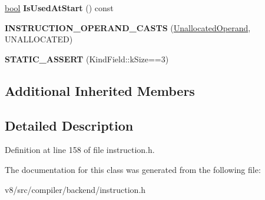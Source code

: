 \begin{DoxyCompactItemize}
\mbox{\label{classv8_1_1internal_1_1compiler_1_1UnallocatedOperand_a6c28fc45804f2f28a4a58321ccce1fe8}} 
\mbox{\hyperlink{classbool}{bool}} {\bfseries Is\+Used\+At\+Start} () const
\item 
\mbox{\label{classv8_1_1internal_1_1compiler_1_1UnallocatedOperand_aa1f74bb77dcc743aa2d99418bfd5607e}} 
{\bfseries I\+N\+S\+T\+R\+U\+C\+T\+I\+O\+N\+\_\+\+O\+P\+E\+R\+A\+N\+D\+\_\+\+C\+A\+S\+TS} (\mbox{\hyperlink{classv8_1_1internal_1_1compiler_1_1UnallocatedOperand}{Unallocated\+Operand}}, U\+N\+A\+L\+L\+O\+C\+A\+T\+ED)
\item 
\mbox{\label{classv8_1_1internal_1_1compiler_1_1UnallocatedOperand_ad1f69843107333599cda246905caf549}} 
{\bfseries S\+T\+A\+T\+I\+C\+\_\+\+A\+S\+S\+E\+RT} (Kind\+Field\+::k\+Size==3)
\end{DoxyCompactItemize}
\subsection*{Additional Inherited Members}


\subsection{Detailed Description}


Definition at line 158 of file instruction.\+h.



The documentation for this class was generated from the following file\+:\begin{DoxyCompactItemize}
\item 
v8/src/compiler/backend/instruction.\+h\end{DoxyCompactItemize}
